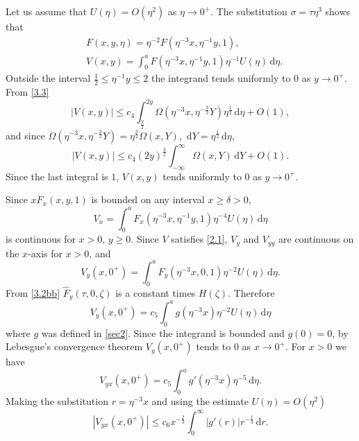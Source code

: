 \documentclass[leqno]{article}
\numberwithin{equation}{section}
\theoremstyle{plain}
\newcommand{\dd}{\,\mathrm{d}}
\begin{document}
Let us assume that $U(\eta) = O(\eta^2) $ as $\eta \to 0^+$. 
The substitution $\sigma = \tau \eta^3$ shows that
\begin{align*}
	& F(x,y,\eta) = \eta^{-2} F(\eta^{-3}x, \eta^{-1}y,1), \\
	& V(x,y) = \int_0^a F(\eta^{-3}x,\eta^{-1}y,1) \eta^{-1} U(\eta) \dd \eta.
\end{align*}
Outside the interval $\frac 12 \leq \eta^{-1} y \leq 2$ the integrand tends uniformly to $0$ as $y \to 0^+$.
From \eqref{3.3}
\begin{equation*}
	|V(x,y)| \leq c_4 \int_{\frac y 2}^{2y} \Omega(\eta^{-3}x,\eta^{-\frac 32}Y) \eta^{\frac 12} \dd \eta + O(1),
\end{equation*}
and since $\Omega(\eta^{-3}x,\eta^{-\frac 32}Y) = \eta^{\frac 32} \Omega(x,Y)$, $\dd Y = \eta^{\frac 12} \dd \eta$,
\begin{equation*}
	|V(x,y)| \leq c_4 (2y)^{\frac 32} \int_{-\infty}^\infty \Omega(x,Y) \dd Y + O(1).
\end{equation*}
Since the last integral is $1$, $V(x,y)$ tends uniformly to $0$ as $y \to 0^+$.

Since $xF_x(x,y,1)$ is bounded on any interval $x \geq \delta > 0$,
\begin{equation*}
	V_x = \int_0^a F_x(\eta^{-3}x,\eta^{-1}y,1)\eta^{-4}U(\eta) \dd \eta
\end{equation*}
is continuous for $x > 0$, $y \geq 0$.
Since $V$ satisfies \eqref{2.1}, $V_y$ and $V_{yy}$ are continuous on the $x$-axis for $x > 0$, and
\begin{equation}
	V_y(x,0^+) = \int_0^a F_y(\eta^{-3}x,0,1) \eta^{-2} U(\eta) \dd \eta.
\end{equation}
From \eqref{3.2bb} $\hat{F}_y(\tau,0,\zeta)$ is a constant times $H(\zeta)$.
Therefore
\begin{equation}
	\label{3.4}
	V_y(x,0^+) = c_5 \int_0^a g(\eta^{-3}x) \eta^{-2} U(\eta) \dd \eta
\end{equation}
where $g$ was defined in \cref{sec2}.
Since the integrand is bounded and $g(0)=0$, by Lebesgue's convergence theorem $V_y(x,0^+)$ tends to $0$ as $x \to 0^+$.
For $x > 0$ we have
\begin{equation*}
	V_{yx}(x,0^+) = c_5 \int_0^a g'(\eta^{-3}x) \eta^{-5} \dd \eta.
\end{equation*}
Making the substitution $r = \eta^{-3}x$ and using the estimate $U(\eta) = O(\eta^2)$
\begin{equation*}
	|V_{yx}(x,0^+)| \leq c_6 x^{-\frac 23} \int_0^\infty |g'(r)| r^{-\frac 13} \dd r.
\end{equation*}
\end{document}

